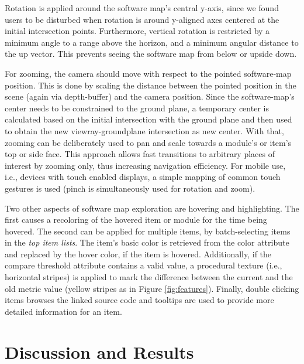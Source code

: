 \documentclass[annual]{acmsiggraph}
\begin{document}
Rotation is applied around the software map's central y-axis, since we found users to be disturbed when rotation is around y-aligned axes centered at the initial intersection points.
Furthermore, vertical rotation is restricted by a minimum angle to a range above the horizon, and a minimum angular distance to the up vector.
This prevents seeing the software map from below or upside down.

For zooming, the camera should move with respect to the pointed software-map position.
This is done by scaling the distance between the pointed position in the scene (again via depth-buffer) and the camera position.
Since the software-map's center needs to be constrained to the ground plane, a temporary center is calculated based on the initial intersection with the ground plane and then used to obtain the new viewray-groundplane intersection as new center.
With that, zooming can be deliberately used to pan and scale towards a module's or item's top or side face.
This approach allows fast transitions to arbitrary places of interest by zooming only, thus increasing navigation efficiency.
For mobile use, i.e., devices with touch enabled displays, a simple mapping of common touch gestures is used (pinch is simultaneously used for rotation and zoom).

Two other aspects of software map exploration are hovering and highlighting.
The first causes a recoloring of the hovered item or module for the time being hovered.
The second can be applied for multiple items, by batch-selecting items in the \emph{top item lists}.
The item's basic color is retrieved from the color attribute and replaced by the hover color, if the item is hovered. 
Additionally, if the compare threshold attribute contains a valid value, a procedural texture (i.e., horizontal stripes) is applied to mark the difference between the current and the old metric value (yellow stripes as in Figure \ref{fig:features}).
Finally, double clicking items browses the linked source code and tooltips are used to provide more detailed information for an item.

\section{Discussion and Results}
\end{document}

